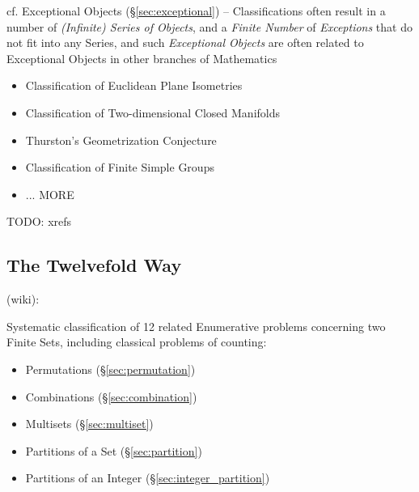 cf. Exceptional Objects (\S\ref{sec:exceptional}) -- Classifications often
result in a number of \emph{(Infinite) Series of Objects}, and a \emph{Finite
  Number} of \emph{Exceptions} that do not fit into any Series, and such
\emph{Exceptional Objects} are often related to Exceptional Objects in other
branches of Mathematics

\begin{itemize}
  \item Classification of Euclidean Plane Isometries
  \item Classification of Two-dimensional Closed Manifolds
  \item Thurston's Geometrization Conjecture
  \item Classification of Finite Simple Groups
  \item ... MORE
\end{itemize}

TODO: xrefs



\subsection{The Twelvefold Way}\label{sec:twelvefold_way}

(wiki):

Systematic classification of 12 related Enumerative problems concerning two
Finite Sets, including classical problems of counting:
\begin{itemize}
  \item Permutations (\S\ref{sec:permutation})
  \item Combinations (\S\ref{sec:combination})
  \item Multisets (\S\ref{sec:multiset})
  \item Partitions of a Set (\S\ref{sec:partition})
  \item Partitions of an Integer (\S\ref{sec:integer_partition})
\end{itemize}

